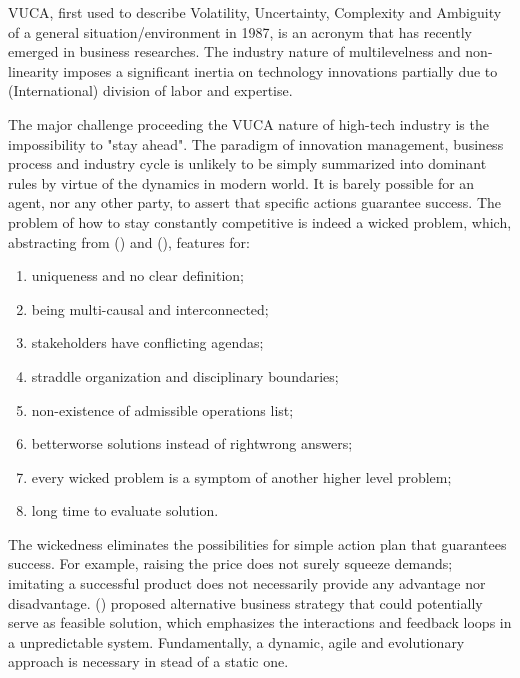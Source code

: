 \documentclass[utf8,english]{gradu3}
\begin{document}
VUCA, first used to describe Volatility, Uncertainty, Complexity and Ambiguity of a general situation/environment in 1987, is an acronym that has recently emerged in business researches. The industry nature of multilevelness and non-linearity imposes a significant inertia on technology innovations partially due to (International) division of labor and expertise.

The major challenge proceeding the VUCA nature of high-tech industry is the impossibility to "stay ahead". The paradigm of innovation management, business process and industry cycle is unlikely to be simply summarized into dominant rules by virtue of the dynamics in modern world. It is barely possible for an agent, nor any other party, to assert that specific actions guarantee success. The problem of how to stay constantly competitive is indeed a wicked problem, which, abstracting from \citeauthor{rittel1974wicked} (\citeyear{rittel1974wicked}) and \citeauthor{buchanan1992wicked} (\citeyear{buchanan1992wicked}), features for:

\begin{enumerate}
    \item uniqueness and no clear definition;
    \item being multi-causal and interconnected;
    \item stakeholders have conflicting agendas;
    \item straddle organization and disciplinary boundaries;
    \item non-existence of admissible operations list;
    \item better\/worse solutions instead of right\/wrong answers;
    \item every wicked problem is a symptom of another higher level problem;
    \item long time to evaluate solution.
\end{enumerate}

The wickedness eliminates the possibilities for simple action plan that guarantees success. For example, raising the price does not surely squeeze demands; imitating a successful product does not necessarily provide any advantage nor disadvantage. \citeauthor{burnes2005complexity} (\citeyear{burnes2005complexity}) proposed alternative business strategy that could potentially serve as feasible solution, which emphasizes the interactions and feedback loops in a unpredictable system. Fundamentally, a dynamic, agile and evolutionary approach is necessary in stead of a static one.
\end{document}
